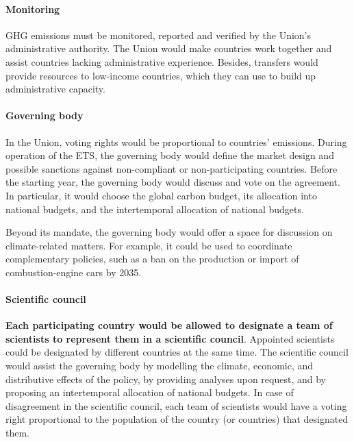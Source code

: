 \documentclass[12pt,english]{article}
\begin{document}
\paragraph{Monitoring}
GHG emissions must be monitored, reported and verified by the Union's administrative authority. The Union would make countries work together and assist countries lacking administrative experience. Besides, transfers would provide resources to low-income countries, which they can use to build up administrative capacity. 

\paragraph{Governing body} 
In the Union, voting rights would be proportional to countries' emissions. %
During operation of the ETS, the governing body would define the market design and possible sanctions against non-compliant or non-participating countries.  %
Before the starting year, the governing body would discuss and vote on the agreement. In particular, it would choose the global carbon budget, its allocation into national budgets, and the intertemporal allocation of national budgets. 

Beyond its mandate, the governing body would offer a space for discussion on climate-related matters. For example, it could be used to coordinate complementary policies, such as a ban on the production or import of combustion-engine cars by 2035.

\paragraph{Scientific council}
\textbf{Each participating country would be allowed to designate a team of scientists to represent them in a scientific council}. Appointed scientists could be designated by different countries at the same time. The scientific council would assist the governing body by modelling the climate, economic, and distributive effects of the policy, by providing analyses upon request, and by proposing an intertemporal allocation of national budgets. In case of disagreement in the scientific council, each team of scientists would have a voting right proportional to the population %
of the country (or countries) that designated them.
\end{document}
